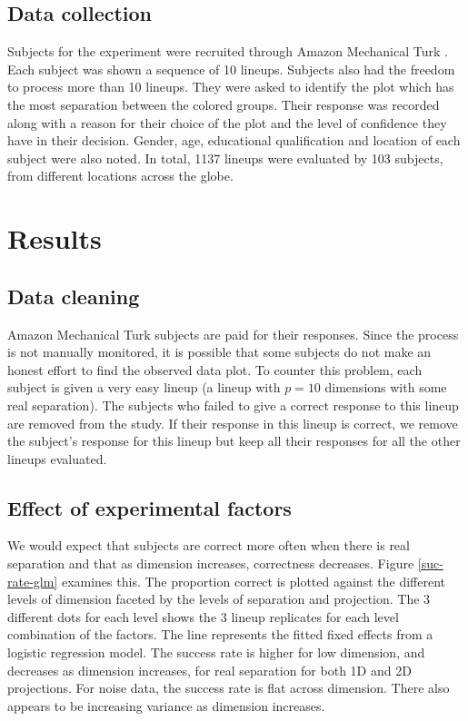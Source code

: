 
\subsection{Data collection}

Subjects  for the experiment were recruited through Amazon Mechanical Turk  \citep{turk}. Each subject was shown a sequence of 10 lineups. Subjects also had the freedom to process more than 10 lineups. They were asked to identify the plot which has the most separation between the colored groups. Their response was recorded along with a reason for their choice of the plot and the level of confidence they have in their decision.  Gender, age, educational qualification and location of each subject were also noted. In total, 1137 lineups were evaluated by 103 subjects, from different locations across the globe.


\section{Results} \label{sec:results}

\subsection{Data cleaning}

Amazon Mechanical Turk subjects are paid for their responses. Since the process is not manually monitored, it is possible that some subjects do not make an honest effort to find the observed data plot. To counter this problem, each subject is given a very easy lineup (a lineup with $p = 10$ dimensions with some real separation). The subjects who failed to give a correct response to this lineup are removed from the study. If their response in this lineup is correct, we remove the subject's response for this lineup but keep all their responses for all the other lineups evaluated.

\subsection{Effect of experimental factors} \label{effects}

We would expect that subjects are correct more often when there is real separation and that as dimension increases, correctness decreases. Figure \ref{suc-rate-glm} examines this. The proportion correct is plotted against the different levels of dimension faceted by the levels of separation and projection. The 3 different dots for each level shows the 3 lineup replicates for each level combination of the factors. The line represents the fitted fixed effects from a logistic regression model. The success rate is higher for low dimension, and decreases as dimension increases, for real separation for both 1D and 2D projections. For noise data, the success rate is flat across dimension. There also appears to be increasing variance as dimension increases.

